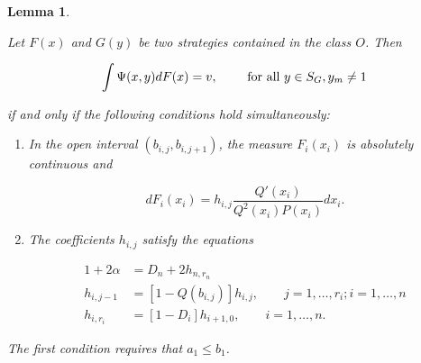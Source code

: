 \documentclass{article}
\newtheorem{lemma}{Lemma}
\theoremstyle{remark}
\begin{document}
\begin{lemma} \label{lemma:coefficient-equations}

Let $F(x)$ and $G(y)$ be two strategies contained in the class $O$. Then

\[
\int \Psi(x, y) dF(x) = v, \qquad \textup{ for all } y \in S_G, y_m \neq 1
\]

if and only if the following conditions hold simultaneously:

\begin{enumerate}

\item In the open interval $(b_{i, j}, b_{i, j+1})$, the measure $F_i(x_i)$ is
absolutely continuous and

\[
dF_i(x_i) = h_{i, j} \frac{Q'(x_i)}{Q^2(x_i) P(x_i)} dx_i.
\]

\item The coefficients $h_{i, j}$ satisfy the equations

\[
\begin{aligned}
1 + 2\alpha &= D_n + 2h_{n, r_n} \\
h_{i, j-1} &= [1 - Q(b_{i, j})] h_{i, j}, \qquad j = 1, \dots, r_i; i = 1,
\dots, n \\
h_{i, r_i} &= [1 - D_i] h_{i+1, 0}, \qquad i = 1, \dots, n.
\end{aligned}
\]

\end{enumerate}

The first condition requires that $a_1 \leq b_1$.

\end{lemma}
\end{document}

